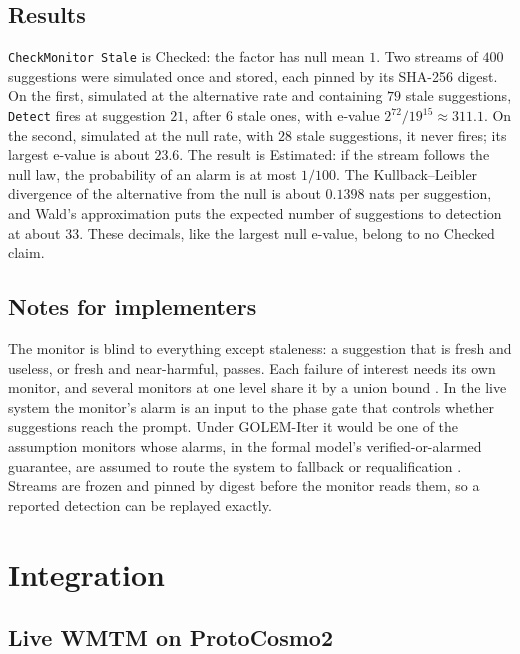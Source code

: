 \documentclass[11pt]{article}
\newcommand{\code}[1]{\texttt{#1}}
\theoremstyle{definition}
\theoremstyle{plain}
\begin{document}
\subsection{Results}

\code{CheckMonitor Stale} is Checked: the factor has null mean $1$. Two streams of $400$ suggestions
were simulated once and stored, each pinned by its SHA-256 digest. On the first, simulated at the
alternative rate and containing $79$ stale suggestions, \code{Detect} fires at suggestion $21$, after
$6$ stale ones, with e-value $2^{72}/19^{15}\approx311.1$. On the second, simulated at the null rate,
with $28$ stale suggestions, it never fires; its largest e-value is about $23.6$. The result is
Estimated: if the stream follows the null law, the probability of an alarm is at most $1/100$. The
Kullback--Leibler divergence of the alternative from the null is about $0.1398$ nats per suggestion,
and Wald's approximation puts the expected number of suggestions to detection at about $33$. These
decimals, like the largest null e-value, belong to no Checked claim.

\subsection{Notes for implementers}

The monitor is blind to everything except staleness: a suggestion that is fresh and useless, or
fresh and near-harmful, passes. Each failure of interest needs its own monitor, and several
monitors at one level share it by a union bound \cite[Section~6.8]{worked}. In the live system the
monitor's alarm is an input to the phase gate that controls whether suggestions reach the prompt.
Under GOLEM-Iter it would be one of the assumption monitors whose alarms, in the formal model's
verified-or-alarmed guarantee, are assumed to route the system to fallback or requalification
\cite{golemformal}.
Streams are frozen and pinned by digest before the monitor reads them, so a reported detection can
be replayed exactly.

\section{Integration}\label{sec:integration}

\subsection{Live WMTM on ProtoCosmo2}\label{sec:livewmtm}
\end{document}
